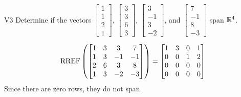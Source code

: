 \begin{problem}{V3}
Determine if the vectors \(\begin{bmatrix} 1 \\ 1 \\ 2 \\1 \end{bmatrix}\), \(\begin{bmatrix} 3 \\ 3 \\ 6 \\ 3 \end{bmatrix}\), \(\begin{bmatrix}3 \\ -1 \\ 3 \\ -2\end{bmatrix}\), and \(\begin{bmatrix} 7 \\ -1 \\ 8 \\ -3 \end{bmatrix}\)  span \(\mathbb{R}^4\).
\end{problem}
\begin{solution}
\[\operatorname{RREF}\left(\begin{bmatrix} 1 & 3 & 3 & 7 \\ 1 & 3 & -1 & -1 \\ 2 & 6 & 3 & 8 \\ 1 & 3 & -2 & -3 \end{bmatrix}\right) = \begin{bmatrix} 1 & 3 & 0 & 1 \\ 0 & 0 & 1 & 2 \\ 0 & 0 & 0 & 0 \\ 0 & 0 & 0 & 0  \end{bmatrix}\]
Since there are zero rows, they do not span.
\end{solution}

